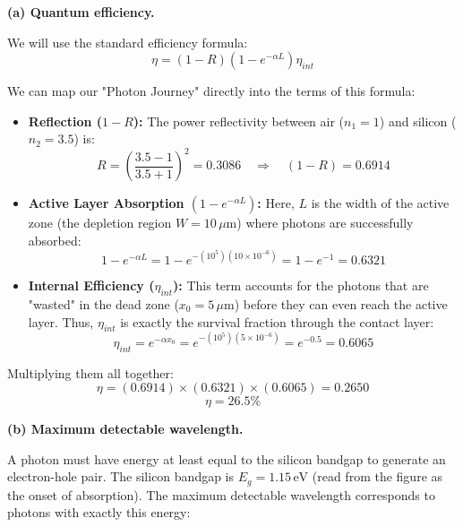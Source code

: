 \textbf{(a) Quantum efficiency.}

We will use the standard efficiency formula:
\begin{equation*}
  \eta = (1-R)(1 - e^{-\alpha L})\eta_{int}
\end{equation*}

We can map our "Photon Journey" directly into the terms of this formula:
\begin{itemize}
  \item \textbf{Reflection ($1-R$):} The power reflectivity between air ($n_1 = 1$) and silicon ($n_2 = 3.5$) is:
  \begin{equation*}
    R = \left(\frac{3.5 - 1}{3.5 + 1}\right)^2 = 0.3086 \quad\Longrightarrow\quad (1-R) = 0.6914
  \end{equation*}
  
  \item \textbf{Active Layer Absorption $(1 - e^{-\alpha L})$:} Here, $L$ is the width of the active zone (the depletion region $W = 10\,\mu\text{m}$) where photons are successfully absorbed:
  \begin{equation*}
    1 - e^{-\alpha L} = 1 - e^{-(10^5)(10\times10^{-6})} = 1 - e^{-1} = 0.6321
  \end{equation*}
  
  \item \textbf{Internal Efficiency ($\eta_{int}$):} This term accounts for the photons that are "wasted" in the dead zone ($x_0 = 5\,\mu\text{m}$) before they can even reach the active layer. Thus, $\eta_{int}$ is exactly the survival fraction through the contact layer:
  \begin{equation*}
    \eta_{int} = e^{-\alpha x_0} = e^{-(10^5)(5\times10^{-6})} = e^{-0.5} = 0.6065
  \end{equation*}
\end{itemize}

Multiplying them all together:
\begin{equation*}
  \eta = (0.6914) \times (0.6321) \times (0.6065) = 0.2650
\end{equation*}
\begin{equation*}
  \boxed{\eta = 26.5\%}
\end{equation*}

\textbf{(b) Maximum detectable wavelength.}

A photon must have energy at least equal to the silicon bandgap to generate an electron-hole pair. The silicon bandgap is $E_g = 1.15\,\text{eV}$ (read from the figure as the onset of absorption). The maximum detectable wavelength corresponds to photons with exactly this energy:

